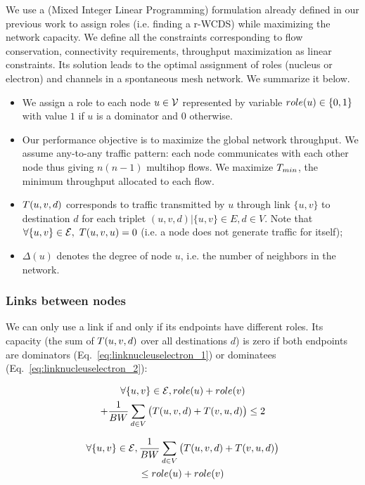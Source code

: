 \documentclass[twoside]{article}
\begin{document}
We use a \milp(Mixed Integer Linear Programming) formulation already
defined in our previous work \cite{molecular_milp09rr} to assign roles
(i.e. finding a r-WCDS) while maximizing the network capacity.  We
define all the constraints corresponding to flow conservation,
connectivity requirements, throughput maximization as linear
constraints. Its solution leads to the optimal assignment of roles
(nucleus or electron) and channels in a spontaneous mesh network.  We
summarize it below.
\begin{itemize}
\item We assign a role to each node $u\in \mathcal{V}$ represented by variable
  $role(u) \in \{0,1\}$ with value $1$ if $u$ is a dominator and $0$
  otherwise.
\item Our performance objective is to maximize the global network
  throughput. We assume any-to-any traffic pattern: each node
  communicates with each other node thus giving $n(n-1)$ multihop
  flows. We maximize $T_{min}$, the minimum throughput allocated
  to each flow.
\item $T(u,v,d)$ corresponds to traffic transmitted by $u$
  through link $\{u,v\}$ to destination $d$ for each triplet $(u,v,d)
  | \{u,v\} \in E, d \in V$. Note that $\forall \{u,v\} \in \mathcal{E},\ T(u,v,u)=0$ (i.e. a node does not generate traffic for itself);
\item $\Delta(u)$ denotes the degree of node $u$, i.e. the number of
  neighbors in the network.
\end{itemize}

\subsubsection{Links between nodes} 
We can only use a link if and only if its endpoints have different roles. Its capacity (the sum of $T(u,v,d)$ over all
destinations $d$) is zero if both endpoints are dominators (Eq.~\ref{eq:linknucleuselectron_1}) or dominatees (Eq.~\ref{eq:linknucleuselectron_2}):
\setlength{\arraycolsep}{0.0em}

\begin{multline}
	\forall \{u,v\}\in \mathcal{E}, role(u)+role(v) \\+  \frac{1}{BW}\sum_{d\in V}\big(T(u,v,d)+T(v,u,d)\big) \leq 2 	
	\label{eq:linknucleuselectron_1}
\end{multline}

\begin{multline}
	\forall \{u,v\}\in \mathcal{E}, \frac{1}{BW}\sum_{d\in V}\big(T(u,v,d) + T(v,u,d)\big) \\ \leq role(u)+role(v)
	\label{eq:linknucleuselectron_2}
\end{multline}
\end{document}
